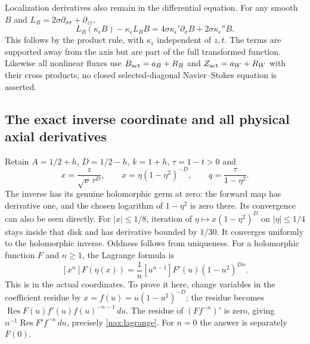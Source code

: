 Localization derivatives also remain in the differential equation.
For any smooth $B$ and $L_B=2\sigma\partial_{\sigma\sigma}+\partial_{zz}$,
\[
 L_B(\kappa_\epsilon B)-\kappa_\epsilon L_BB
       =4\sigma\kappa_\epsilon'\partial_\sigma B
          +2\sigma\kappa_\epsilon''B.
\]
This follows by the product rule, with $\kappa_\epsilon$ independent
of $z,t$. The terms are supported away from the axis but are part of
the full transformed function. Likewise all nonlinear fluxes use
$B_{\rm act}=a_B+R_B$ and $Z_{\rm act}=a_W+R_W$ with their cross
products; no closed selected-diagonal Navier--Stokes equation is asserted.

\subsection{The exact inverse coordinate and all physical axial derivatives}

Retain $A=1/2+h$, $D=1/2-h$, $k=1+h$, $\tau=1-t>0$ and
\[
 x=\frac{z}{\sqrt\nu\,\tau^D},\qquad
 x=\eta(1-\eta^2)^{-D},\qquad q=\frac{\tau}{1-\eta^2}.
\]
The inverse has its genuine holomorphic germ at zero: the forward
map has derivative one, and the chosen logarithm of $1-\eta^2$
is zero there. Its convergence can also be seen directly. For
$|x|\leq1/8$, iteration of $\eta\mapsto x(1-\eta^2)^D$ on
$|\eta|\leq1/4$ stays inside that disk and has derivative bounded
by $1/30$. It converges uniformly to the holomorphic inverse.
Oddness follows from uniqueness. For a holomorphic function $F$ and
$n\geq1$, the Lagrange formula is
\begin{equation}\label{nax:lagrange}
 [x^n]F(\eta(x))=
 \frac1n[u^{n-1}]F'(u)(1-u^2)^{Dn}.
\end{equation}
This is \cite[Corollary~5.4.3, (5.65)]{stanleyEC2Lagrange} in the
actual coordinates. To prove it here, change variables in the coefficient
residue by $x=f(u)=u(1-u^2)^{-D}$; the residue becomes
$\operatorname{Res}F(u)f'(u)f(u)^{-n-1}\,du$.
The residue of $(Ff^{-n})'$ is zero, giving
$n^{-1}\operatorname{Res}F'f^{-n}\,du$, precisely
\eqref{nax:lagrange}. For $n=0$ the answer is separately $F(0)$.

